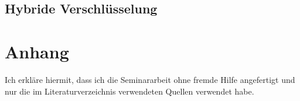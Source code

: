 \documentclass[14pt,a4paper]{scrartcl}
\begin{document}
	 	
	\subsection{Hybride Verschlüsselung}

\pagebreak
\section{Anhang}

\listoffigures
\pagebreak

\nocite{*}
\printbibliography
\pagebreak

\begin{flushleft}
Ich erkläre hiermit, dass ich die Seminararbeit ohne fremde Hilfe angefertigt und nur die im Literaturverzeichnis verwendeten Quellen verwendet habe.
\end{flushleft}
\end{document}

